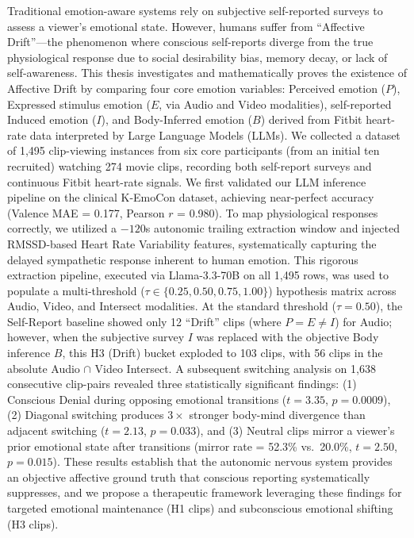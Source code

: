 \documentclass[11pt, a4paper]{report}
\begin{document}
Traditional emotion-aware systems rely on subjective self-reported surveys to assess a viewer's emotional state. However, humans suffer from ``Affective Drift''---the phenomenon where conscious self-reports diverge from the true physiological response due to social desirability bias, memory decay, or lack of self-awareness. This thesis investigates and mathematically proves the existence of Affective Drift by comparing four core emotion variables: Perceived emotion ($P$), Expressed stimulus emotion ($E$, via Audio and Video modalities), self-reported Induced emotion ($I$), and Body-Inferred emotion ($B$) derived from Fitbit heart-rate data interpreted by Large Language Models (LLMs). We collected a dataset of 1,495 clip-viewing instances from six core participants (from an initial ten recruited) watching 274 movie clips, recording both self-report surveys and continuous Fitbit heart-rate signals. We first validated our LLM inference pipeline on the clinical K-EmoCon dataset, achieving near-perfect accuracy (Valence MAE = 0.177, Pearson $r$ = 0.980). To map physiological responses correctly, we utilized a $-120$s autonomic trailing extraction window and injected RMSSD-based Heart Rate Variability features, systematically capturing the delayed sympathetic response inherent to human emotion. This rigorous extraction pipeline, executed via Llama-3.3-70B on all 1,495 rows, was used to populate a multi-threshold ($\tau \in \{0.25, 0.50, 0.75, 1.00\}$) hypothesis matrix across Audio, Video, and Intersect modalities. At the standard threshold ($\tau = 0.50$), the Self-Report baseline showed only 12 ``Drift'' clips (where $P = E \neq I$) for Audio; however, when the subjective survey $I$ was replaced with the objective Body inference $B$, this H3 (Drift) bucket exploded to 103 clips, with 56 clips in the absolute Audio $\cap$ Video Intersect. A subsequent switching analysis on 1,638 consecutive clip-pairs revealed three statistically significant findings: (1) Conscious Denial during opposing emotional transitions ($t = 3.35$, $p = 0.0009$), (2) Diagonal switching produces $3\times$ stronger body-mind divergence than adjacent switching ($t = 2.13$, $p = 0.033$), and (3) Neutral clips mirror a viewer's prior emotional state after transitions (mirror rate = 52.3\% vs.\ 20.0\%, $t = 2.50$, $p = 0.015$). These results establish that the autonomic nervous system provides an objective affective ground truth that conscious reporting systematically suppresses, and we propose a therapeutic framework leveraging these findings for targeted emotional maintenance (H1 clips) and subconscious emotional shifting (H3 clips).
\cleardoublepage
\end{document}
